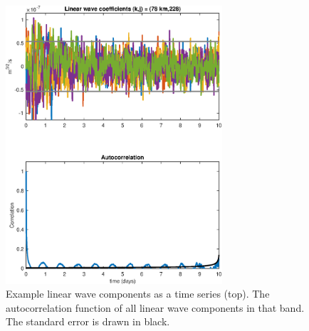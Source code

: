 \documentclass[10pt]{article}
\begin{document}
\begin{figure}[t]
  \centerline{\includegraphics[width=19pc,angle=0]{figures/Autocorrelation_k_12_j_228}}
  \caption{Example linear wave components as a time series (top). The autocorrelation function of all linear wave components in that band. The standard error is drawn in black.}
  \label{Autocorrelation_k_12_j_228}
\end{figure}
\end{document}
